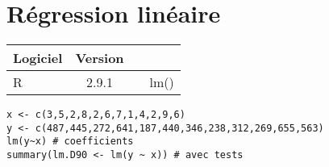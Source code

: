 \section{R\'egression lin\'eaire}
\begin{tabular}{lc|l@{ = }l}
	Logiciel & Version \\
	\hline
	R & 2.9.1 &  & lm()
\end{tabular}

\begin{ex}
\begin{verbatim}
x <- c(3,5,2,8,2,6,7,1,4,2,9,6)
y <- c(487,445,272,641,187,440,346,238,312,269,655,563)
lm(y~x) # coefficients
summary(lm.D90 <- lm(y ~ x)) # avec tests
\end{verbatim}
\end{ex}
